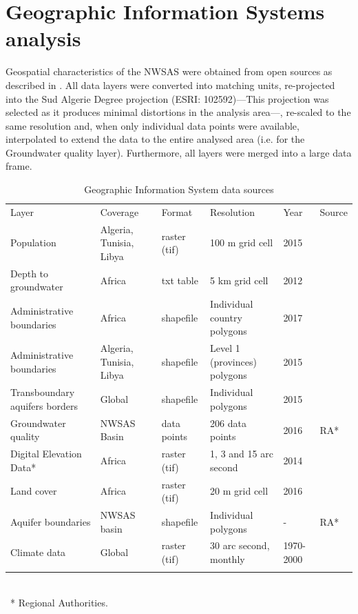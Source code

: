\documentclass[12pt]{iopart}
\begin{document}
\section{Geographic Information Systems analysis}
Geospatial characteristics of the NWSAS were obtained from open sources as described in  . All data layers were converted into matching units, re-projected into the Sud Algerie Degree projection (ESRI: 102592)---This projection was selected as it produces minimal distortions in the analysis area---, re-scaled to the same resolution and, when only individual data points were available, interpolated to extend the data to the entire analysed area (i.e. for the Groundwater quality layer). Furthermore, all layers were merged into a large data frame.
\begin{table}[!h]
	\caption{\label{tbl:datasources}Geographic Information System data sources}
	{\footnotesize
		\begin{tabular*}{\textwidth}{@{}P{1.4in} P{1in} l P{1.2in} l l@{}}
			\br
			Layer & Coverage & Format & Resolution & Year & Source\\
			\mr
			Population & Algeria, Tunisia, Libya & raster (tif) & 100 m grid cell & 2015 & \cite{Worldpop2012}\\\ms
			Depth to groundwater & Africa & txt table & 5 km grid cell & 2012 & \cite{Quantitativemapsgroundwater2012a}\\\ms
			Administrative boundaries & Africa & shapefile & Individual country polygons & 2017 & \cite{Humanitarian2017}\\\ms
			Administrative boundaries & Algeria, Tunisia, Libya & shapefile & Level 1 (provinces) polygons & 2015 & \cite{GADM}\\\ms
			Transboundary aquifers borders & Global & shapefile & Individual polygons & 2015 & \cite{IGRAC}\\\ms
			Groundwater quality & NWSAS Basin & data points & 206 data points & 2016 & RA*\\\ms
			Digital Elevation Data* & Africa & raster (tif) & 1, 3 and 15 arc second & 2014 & \cite{DEM2014}\\\ms
			Land cover & Africa & raster (tif) & 20 m grid cell & 2016 & \cite{ESA2017}\\\ms
			Aquifer boundaries & NWSAS basin & shapefile & Individual polygons & - & RA*\\\ms
			Climate data & Global & raster (tif) & 30 arc second, monthly & 1970-2000 & \cite{WorldClimGlobalClimate}\\
			\br
		\end{tabular*}\\
		~* Regional Authorities.
	}
\end{table}
\end{document}
